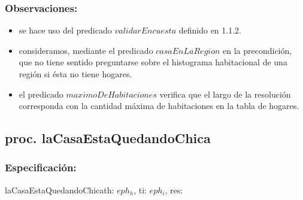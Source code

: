 \documentclass[a4paper]{article}
\begin{document}
    \subsubsection{Observaciones:}
        \begin{itemize}
            \item se hace uso del predicado $validarEncuesta$ definido en 1.1.2.
            \item consideramos, mediante el predicado $casaEnLaRegion$ en la precondici\'on, que no tiene sentido preguntarse sobre el 
            histograma habitacional de una regi\'on si \'esta no tiene hogares.
            \item el predicado $maximoDeHabitaciones$ verifica que el largo de la resolución corresponda con la cantidad 
            máxima de habitaciones en la tabla de hogares.
        \end{itemize}


\pagebreak
\subsection{proc. laCasaEstaQuedandoChica}

    \subsubsection{Especificaci\'on:}
        \begin{proc}{laCasaEstaQuedandoChica}{\In th: $eph_{h}$, \In ti: $eph_{i}$, \Out res: \TLista{\float}}{}
        \end{proc}
\end{document}
